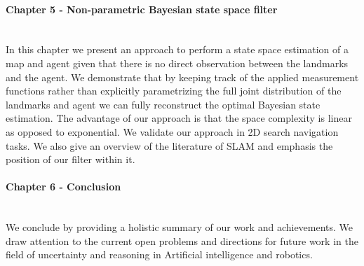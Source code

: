 \begin{minipage}[c]{0.9\textwidth}
\paragraph{Chapter 5 - Non-parametric Bayesian state space filter}\\
In this chapter we present an approach to perform a state space estimation of a map and agent 
given that there is no direct observation between the landmarks and the agent. 
We demonstrate that by keeping track of the applied measurement functions rather than 
explicitly parametrizing the full joint distribution of the landmarks and agent we can fully reconstruct 
the optimal Bayesian state estimation. The advantage of our approach is that the space complexity is linear as opposed 
to exponential. We validate our approach in 2D search navigation tasks.
We also give an overview of the literature of SLAM and emphasis the position of our filter within it.
\end{minipage}

\begin{minipage}[c]{0.9\textwidth}
\paragraph{Chapter 6 - Conclusion}\\
We conclude by providing a holistic summary of our work and achievements. We draw attention to the current 
open problems and directions for future work in the field of uncertainty and reasoning in Artificial intelligence and robotics.
\end{minipage}







